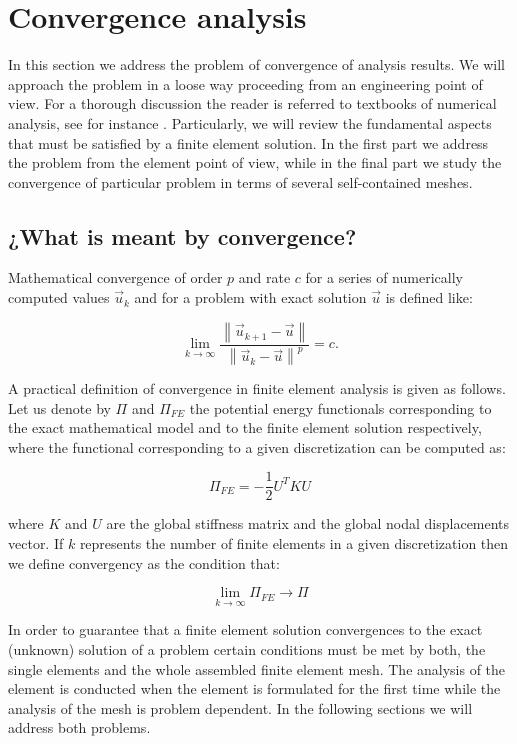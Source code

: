 \newpage
\chapter{Convergence analysis}
In this section we address the problem of convergence of analysis results. We 
will approach the problem in a loose way proceeding from an engineering point 
of view. For a thorough discussion the reader is referred to textbooks of 
numerical analysis, see for instance \cite{abaqus1989karlsson}. Particularly, 
we will review the fundamental aspects that must be satisfied by a finite 
element solution. In the first part we address the problem from the element 
point of view, while in the final part we study the convergence of particular 
problem in terms of several self-contained meshes.

\section{¿What is meant by convergence?}
Mathematical convergence of order $p$ and rate $c$ for a series of numerically computed values $\vec u_{k}$ and for a problem with exact solution $\vec u$ is defined like:

\[\mathop {\lim }\limits_{k \to \infty } \frac{{\left\| {{{\vec u}_{k + 1}} - \vec u} \right\|}}{{{{\left\| {{{\vec u}_k} - \vec u} \right\|}^p}}} = c.\]

A practical definition of convergence in finite element analysis is given as follows. Let us denote by $\Pi$ and $\Pi _{FE}$ the potential energy functionals corresponding to the exact mathematical model and to the finite element solution respectively, where the functional corresponding to a given discretization can be computed as:

\[{\Pi _{FE}} =  - \frac{1}{2}{U^T}KU\]

where $K$ and $U$ are the global stiffness matrix and the global nodal displacements vector. If $k$ represents the number of finite elements in a given discretization then we define convergency as the condition that:

\begin{equation}
\mathop {\lim }\limits_{k \to \infty } {\Pi_{FE}} \to \Pi 
\label{convergence}
\end{equation}


In order to guarantee that a finite element solution convergences to the exact (unknown) solution of a problem certain conditions must be met by both, the single elements and the whole assembled finite element mesh. The analysis of the element is conducted when the element is formulated for the first time while the analysis of the mesh is problem dependent. In the following sections we will address both problems.

